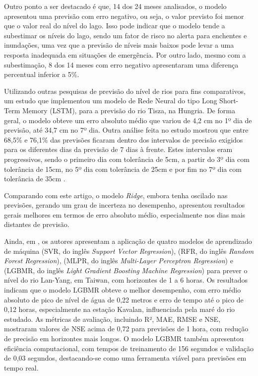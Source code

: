 Outro ponto a ser destacado é que, 14 dos 24 meses analisados, o modelo apresentou uma previsão com erro negativo, ou seja, o valor previsto foi menor que o valor real do nível do lago. Isso pode indicar que o modelo tende a subestimar os níveis do lago, sendo um fator de risco no alerta para enchentes e inundações, uma vez que a previsão de níveis mais baixos pode levar a uma resposta inadequada em situações de emergência. Por outro lado, mesmo com a subestimação, 8 dos 14 meses com erro negativo apresentaram uma diferença percentual inferior a 5\%.

Utilizando outras pesquisas de previsão do nível de rios para fins comparativos, um estudo que implementou um modelo de Rede Neural do tipo Long Short-Term Memory (LSTM), para a previsão do rio Tisza, na Hungria. De forma geral, o modelo obteve um erro absoluto médio que variou de 4,2 cm no 1º dia de previsão, até 34,7 cm no 7º dia. Outra análise feita no estudo mostrou que entre 68,5\% e 76,1\% das previsões ficaram dentro dos intervalos de precisão exigidos para os diferentes dias da previsão de 7 dias à frente. Estes intervalos eram progressivos, sendo o primeiro dia com tolerância de 5cm, a partir do 3º dia com tolerância de 15cm, no 5º dia com tolerância de 25cm e por fim no 7º dia com tolerância de 35cm \cite{Vizi2023}.

Comparando com este artigo, o modelo \textit{Ridge}, embora tenha oscilado nas previsões, gerando um grau de incerteza no desempenho, apresentou resultados gerais melhores em termos de erro absoluto médio, especialmente nos dias mais distantes de previsão.

Ainda, em \cite{Guo2021}, os autores apresentam a aplicação de quatro modelos de aprendizado de máquina (\gls{SVR}, do inglês \textit{Support Vector Regression}), (\gls{RFR}, do inglês \textit{Random Forest Regression}), (\gls{MLPR}, do inglês \textit{Multi-Layer Perceptron Regression}) e (\gls{LGBMR}, do inglês \textit{Light Gradient Boosting Machine Regression}) para prever o nível do rio Lan-Yang, em Taiwan, com horizontes de 1 a 6 horas. Os resultados indicam que o modelo LGBMR obteve o melhor desempenho, com erro médio absoluto de pico de nível de água de 0,22 metros e erro de tempo até o pico de 0,12 horas, especialmente na estação Kavalan, influenciada pela maré do rio estudado. As métricas de avaliação, incluindo R², MAE, RMSE e \gls{NSE}, mostraram valores de NSE acima de 0,72 para previsões de 1 hora, com redução de precisão em horizontes mais longos. O modelo \gls{LGBMR} também apresentou eficiência computacional, com tempos de treinamento de 156 segundos e validação de 0,03 segundos, destacando-se como uma ferramenta viável para previsões em tempo real.

